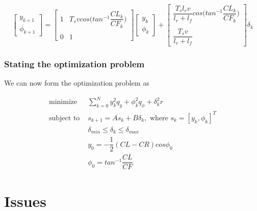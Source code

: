 \documentclass[oneside,12pt]{article}
\begin{document}
    \begin{equation}
      \begin{bmatrix}
        y_{k+1} \\
        \phi_{k+1}
      \end{bmatrix}
      =
      \begin{bmatrix}
        1 & T_s v cos\Big(tan^{-1}\dfrac{CL_k}{CF_k}\Big) \\\\
        0 & 1
      \end{bmatrix}
      \begin{bmatrix}
        y_{k} \\
        \phi_{k}
      \end{bmatrix}
      +
      \begin{bmatrix}
        \dfrac{T_s l_r v}{l_r + l_f} cos\Big(tan^{-1}\dfrac{CL_k}{CF_k}\Big) \\\\
        \dfrac{T_s v}{l_r+l_f}
      \end{bmatrix}
      \delta_{k}
    \end{equation}

    \subsubsection{Stating the optimization problem}

    We can now form the optimization problem as

    \begin{align}
      \text{minimize }    & \sum\limits_{k=0}^N y_k^2 q_y + \phi_k^2 q_{\phi} + \delta_k^2 r \\
      \text{subject to }  & s_{k+1} = A s_k + B \delta_k,\text{ where } s_k = [y_k, \phi_k]^T \\
                          & \delta_{min} \leq \delta_k \leq \delta_{max} \\
                          & y_0 = -\dfrac{1}{2}(CL-CR)cos\phi_0 \\
                          & \phi_0 = tan^{-1}\dfrac{CL}{CF}
    \end{align}



\section{Issues}

\end{document}
